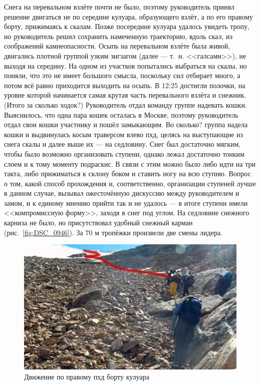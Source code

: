 Снега на перевальном взлёте почти не было, поэтому руководитель принял решение двигаться не по середине кулуара, образующего взлёт, а по его правому борту, прижимаясь к скалам. Позже посередине кулуара удалось увидеть тропу, но руководитель решил сохранить намеченную траекторию, вдоль скал, из соображений камнеопасности. Осыпь на перевальном взлёте была живой, двигались плотной группой узким зигзагом (далее --- т.~н. <<галсами>>), не выходя на середину. На одном из участков попытались выбраться на скалы, но поняли, что это не имеет большого смысла, поскольку сил отбирает много, а потом всё равно приходится выходить на осыпь. В 12:25 достигли полочки, на уровне которой начинается самая крутая часть перевального взлёта и снежник. \alert{(Итого за сколько ходок?)} Руководитель отдал команду группе надевать кошки. Выяснилось, что одна пара кошек осталась в Москве, поэтому руководитель отдал свои кошки участнику и пошёл замыкающим. \alert{Во сколько?} группа надела кошки и выдвинулась косым траверсом влево пхд, целясь на выступающие из снега скалы и далее выше их --- на седловину. Снег был достаточно мягким, чтобы было возможно организовать ступени, однако лежал достаточно тонким слоем и к тому моменту подраскис. В связи с этим можно было либо идти на три такта, либо прижиматься к склону боком и ставить ногу на всю ступню. Вопрос о том, какой способ прохождения и, соответственно, организации ступеней лучше в данном случае, вызывал ожесточённую дискуссию между руководителем и замом, и к единому мнению прийти так и не удалось --- в итоге ступени имели <<компромиссную форму>>, заходя в снег под углом. На седловине снежного карниза не было, но присутствовал удобный снежный карман (рис.~\ref{fig:DSC_0946}). За 70 м тропёжки произвели две смены лидера.

\begin{figure}[h!]
	\centering
	\includegraphics[width=0.7\linewidth]{../pics/20aug3.jpg}
	\caption{Движение по правому пхд борту кулуара}
	\label{fig:20aug3.jpg}
\end{figure}

